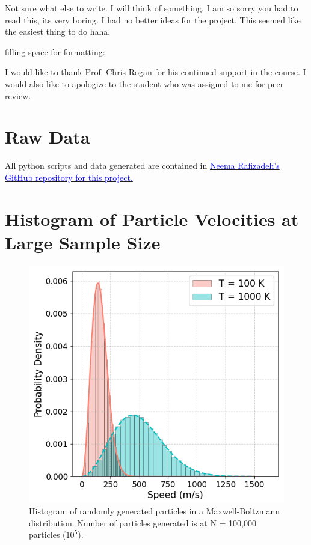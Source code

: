 \documentclass[%
 reprint,
 amsmath,amssymb,
 aps,
]{revtex4-2}
\begin{document}
Not sure what else to write. I will think of something. I am so sorry you had to read this, its very boring. I had no better ideas for the project. This seemed like the easiest thing to do haha.

filling space for formatting: \lipsum[1-2]

\acknowledgements

I would like to thank Prof. Chris Rogan for his continued support in the course. I would also like to apologize to the student who was assigned to me for peer review.

\appendix
\section{Raw Data}

All python scripts and data generated are contained in \href{https://github.com/rafizadehn/PHSX815_Project1}{\textcolor{blue}{Neema Rafizadeh's GitHub repository for this project.}}

\section{Histogram of Particle Velocities at Large Sample Size}

\begin{figure}[H]
	\caption{Histogram of randomly generated particles in a Maxwell-Boltzmann distribution. Number of particles generated is at N = 100,000 particles ($10^5$).}
	\centering
	\includegraphics[scale=0.5]{appendix1.png}
\end{figure}
\end{document}
